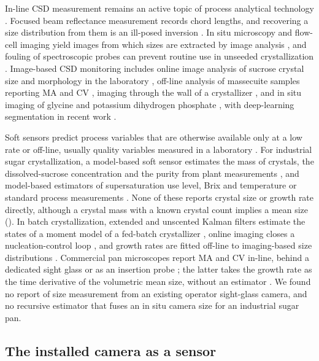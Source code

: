 In-line CSD measurement remains an active topic of process analytical technology \citep{Nagy2013,Simon2015}.
Focused beam reflectance measurement records chord lengths, and recovering a size distribution from them is an
ill-posed inversion \citep{Heath2002,Worlitschek2003,Wynn2003,Kail2009,Czapla2010}. In situ microscopy and flow-cell
imaging yield images from which sizes are extracted by image analysis \citep{Eggers2008,Kempkes2008}, and fouling of
spectroscopic probes can prevent routine use in unseeded crystallization \citep{Borissova2009}. Image-based CSD
monitoring includes online image analysis of sucrose crystal size and morphology in the laboratory
\citep{Ferreira2011}, off-line analysis of massecuite samples reporting MA and CV \citep{Daniels2017}, imaging through
the wall of a crystallizer \citep{Huo2020}, and in situ imaging of glycine \citep{Larsen2007} and potassium
dihydrogen phosphate \citep{Borchert2014}, with deep-learning segmentation in recent work \citep{Gao2018,Manee2019}.

Soft sensors predict process variables that are otherwise available only at a low rate or off-line, usually quality
variables measured in a laboratory \citep{Kadlec2009}. For industrial sugar crystallization, a model-based soft sensor
estimates the mass of crystals, the dissolved-sucrose concentration and the purity from plant measurements
\citep{Damour2010}, and model-based estimators of supersaturation use level, Brix and temperature
\citep{Morales2023} or standard process measurements \citep{Lohani2026}. None of these reports crystal size or growth rate
directly, although a crystal mass with a known crystal count implies a mean size (). In batch crystallization, extended and unscented Kalman filters estimate the states of a moment model of
a fed-batch crystallizer \citep{Mesbah2011}, online imaging closes a nucleation-control loop \citep{Borsos2017}, and
growth rates are fitted off-line to imaging-based size distributions \citep{Ochsenbein2014}. Commercial pan microscopes report MA and CV in-line, behind
a dedicated sight glass \citep{BoucheGaillac2015,Selby2024} or as an insertion probe \citep{Honkanen2023,Honkanen2024};
the latter takes the growth rate as the time derivative of the volumetric mean size, without an estimator \citep{Honkanen2023}. We
found no report of size measurement from an existing operator sight-glass camera, and no recursive estimator that
fuses an in situ camera size for an industrial sugar pan.

\subsection{The installed camera as a sensor}\label{sec:intro-blocks}

